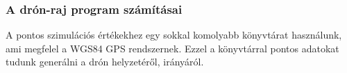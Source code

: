 \subsubsection{A drón-raj program számításai}
A pontos szimulációs értékekhez egy sokkal komolyabb könyvtárat használunk, ami megfelel a WGS84 GPS rendszernek.
Ezzel a könyvtárral pontos adatokat tudunk generálni a drón helyzetéről, irányáról.


\begin{python}
\end{python}


